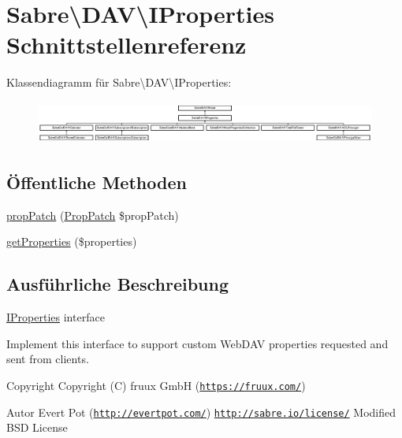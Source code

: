 \hypertarget{interface_sabre_1_1_d_a_v_1_1_i_properties}{}\section{Sabre\textbackslash{}D\+AV\textbackslash{}I\+Properties Schnittstellenreferenz}
\label{interface_sabre_1_1_d_a_v_1_1_i_properties}
Klassendiagramm für Sabre\textbackslash{}D\+AV\textbackslash{}I\+Properties\+:\begin{figure}[H]
\begin{center}
\leavevmode
\includegraphics[height=1.430396cm]{interface_sabre_1_1_d_a_v_1_1_i_properties}
\end{center}
\end{figure}
\subsection*{Öffentliche Methoden}
\begin{DoxyCompactItemize}
\item 
\mbox{\hyperlink{interface_sabre_1_1_d_a_v_1_1_i_properties_a90973262bb85b17f98183ecd600acd84}{prop\+Patch}} (\mbox{\hyperlink{class_sabre_1_1_d_a_v_1_1_prop_patch}{Prop\+Patch}} \$prop\+Patch)
\item 
\mbox{\hyperlink{interface_sabre_1_1_d_a_v_1_1_i_properties_a0d2fcaacf74daaa5cf24ea53a057140a}{get\+Properties}} (\$properties)
\end{DoxyCompactItemize}


\subsection{Ausführliche Beschreibung}
\mbox{\hyperlink{interface_sabre_1_1_d_a_v_1_1_i_properties}{I\+Properties}} interface

Implement this interface to support custom Web\+D\+AV properties requested and sent from clients.

\begin{DoxyCopyright}{Copyright}
Copyright (C) fruux GmbH (\href{https://fruux.com/}{\tt https\+://fruux.\+com/}) 
\end{DoxyCopyright}
\begin{DoxyAuthor}{Autor}
Evert Pot (\href{http://evertpot.com/}{\tt http\+://evertpot.\+com/})  \href{http://sabre.io/license/}{\tt http\+://sabre.\+io/license/} Modified B\+SD License 
\end{DoxyAuthor}


